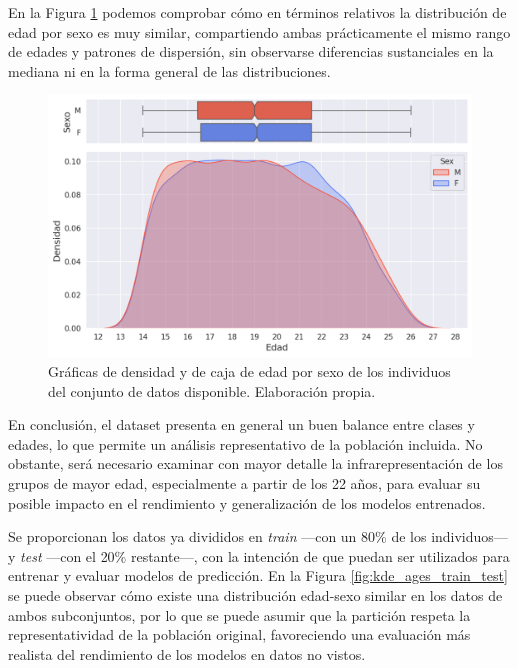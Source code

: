 En la Figura \ref{fig:kde_and_boxplot_ages_sex} podemos comprobar cómo en términos relativos la distribución 
de edad por sexo es muy similar, compartiendo ambas prácticamente el mismo rango de edades y patrones de 
dispersión, sin observarse diferencias sustanciales en la mediana ni en la forma general de las 
distribuciones.

\begin{figure}[h]
    \centering
    \includegraphics[width=\textwidth]{capitulos/cap_04/imagenes/kdeplot_ages.png}
    \caption[
        Gráficas de densidad y de caja de edad por sexo de los individuos del conjunto de datos disponible.
    ]{
        Gráficas de densidad y de caja de edad por sexo de los individuos del conjunto de datos disponible. 
        Elaboración propia.
    } 
    \label{fig:kde_and_boxplot_ages_sex}
\end{figure}

En conclusión, el dataset presenta en general un buen balance entre clases y edades, lo que permite un 
análisis representativo de la población incluida. No obstante, será necesario examinar con mayor detalle la 
infrarepresentación de los grupos de mayor edad, especialmente a partir de los 22 años, para evaluar su 
posible impacto en el rendimiento y generalización de los modelos entrenados.

Se proporcionan los datos ya divididos en \textit{train} ---con un 80\% de los individuos--- y \textit{test}
---con el 20\% restante---, con la intención de que puedan ser utilizados para entrenar y evaluar modelos de 
predicción. En la Figura \ref{fig:kde_ages_train_test} se puede observar cómo existe una distribución 
edad-sexo similar en los datos de ambos subconjuntos, por lo que se puede asumir que la partición respeta la 
representatividad de la población original, favoreciendo una evaluación más realista del rendimiento de los 
modelos en datos no vistos.

